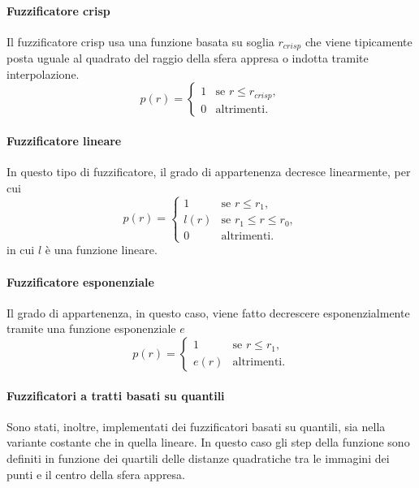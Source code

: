 \documentclass[12pt]{report}
\theoremstyle{definition}
\begin{document}
\paragraph{Fuzzificatore crisp}
Il fuzzificatore crisp usa una funzione basata su soglia $r_{crisp}$ che viene tipicamente posta uguale al quadrato del raggio della sfera appresa o indotta tramite interpolazione.
\begin{equation}
    p(r)= \begin{cases} 1 & \mbox{se } r \leq r_{crisp}, \\ 0 & \mbox{altrimenti.} \end{cases}
\end{equation}

\paragraph{Fuzzificatore lineare}
In questo tipo di fuzzificatore, il grado di appartenenza decresce linearmente, per cui
\begin{equation}
    p(r)= \begin{cases} 1 & \mbox{se } r \leq r_1, \\l(r) & \mbox{se } r_1 \leq r \leq r_0, \\ 0 & \mbox{altrimenti.} \end{cases}
\end{equation}
in cui $l$ è una funzione lineare.

\paragraph{Fuzzificatore esponenziale} Il grado di appartenenza, in questo caso, viene fatto decrescere esponenzialmente tramite una funzione esponenziale $e$
\begin{equation}
    p(r)= \begin{cases} 1 & \mbox{se } r \leq r_1, \\e(r) & \mbox{altrimenti}. \end{cases}
\end{equation}

\paragraph{Fuzzificatori a tratti basati su quantili} Sono stati, inoltre, implementati dei fuzzificatori basati su quantili, sia nella variante costante che in quella lineare.
In questo caso gli step della funzione sono definiti in funzione dei quartili delle distanze quadratiche tra le immagini dei punti e il centro della sfera appresa.
\end{document}
